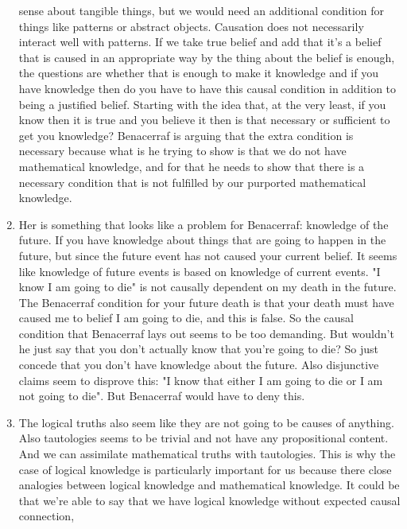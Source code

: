 \documentclass[12pt]{article}
\theoremstyle{definition}
\begin{document}
\begin{enumerate}
        sense about tangible things, but we would need an additional condition
        for things like patterns or abstract objects. Causation does not
        necessarily interact well with patterns. If we take true belief and add
        that it's a belief that is caused in an appropriate way by the thing
        about the belief is enough, the questions are whether that is enough to
        make it knowledge and if you have knowledge then do you have to have
        this causal condition in addition to being a justified belief. Starting
        with the idea that, at the very least, if you know then it is true and
        you believe it then is that necessary or sufficient to get you
        knowledge? Benacerraf is arguing that the extra condition is necessary
        because what is he trying to show is that we do not have mathematical
        knowledge, and for that he needs to show that there is a necessary
        condition that is not fulfilled by our purported mathematical
        knowledge.
    \item
        Her is something that looks like a problem for Benacerraf: knowledge of
        the future. If you have knowledge about things that are going to happen
        in the future, but since the future event has not caused your current
        belief. It seems like knowledge of future events is based on knowledge
        of current events. "I know I am going to die" is not causally dependent
        on my death in the future. The Benacerraf condition for your future
        death is that your death must have caused me to belief I am going to
        die, and this is false. So the causal condition that Benacerraf lays
        out seems to be too demanding. But wouldn't he just say that you don't
        actually know that you're going to die? So just concede that you don't
        have knowledge about the future. Also disjunctive claims seem to
        disprove this: "I know that either I am going to die or I am not going
        to die". But Benacerraf would have to deny this. 
    \item
        The logical truths also seem like they are not going to be causes of
        anything. Also tautologies seems to be trivial and not have any
        propositional content.  And we can assimilate mathematical truths with
        tautologies. This is why the case of logical knowledge is particularly
        important for us because there close analogies between logical
        knowledge and mathematical knowledge. It could be that we're able to
        say that we have logical knowledge without expected causal connection,

\end{enumerate}
\end{document}
